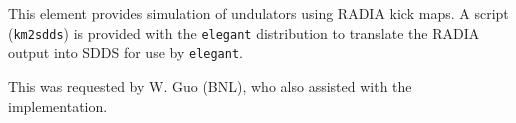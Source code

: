This element provides simulation of undulators using RADIA kick maps.
A script (\verb|km2sdds|) is provided with the {\tt elegant}
distribution to translate the RADIA output into SDDS for use by
\verb|elegant|.

This was requested by W. Guo (BNL), who also assisted with the
implementation.
